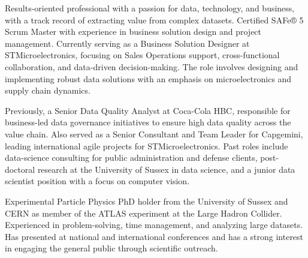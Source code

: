 
Results-oriented professional with a passion for data, technology, and business, with a track record of extracting value from complex datasets. Certified SAFe® 5 Scrum Master with experience in business solution design and project management. Currently serving as a Business Solution Designer at STMicroelectronics, focusing on Sales Operations support, cross-functional collaboration, and data-driven decision-making. The role involves designing and implementing robust data solutions with an emphasis on microelectronics and supply chain dynamics.

Previously, a Senior Data Quality Analyst at Coca-Cola HBC, responsible for business-led data governance initiatives to ensure high data quality across the value chain. Also served as a Senior Consultant and Team Leader for Capgemini, leading international agile projects for STMicroelectronics. Past roles include data-science consulting for public administration and defense clients, post-doctoral research at the University of Sussex in data science, and a junior data scientist position with a focus on computer vision.

Experimental Particle Physics PhD holder from the University of Sussex and CERN as member of the ATLAS experiment at the Large Hadron Collider. Experienced in problem-solving, time management, and analyzing large datasets. Has presented at national and international conferences and has a strong interest in engaging the general public through scientific outreach.